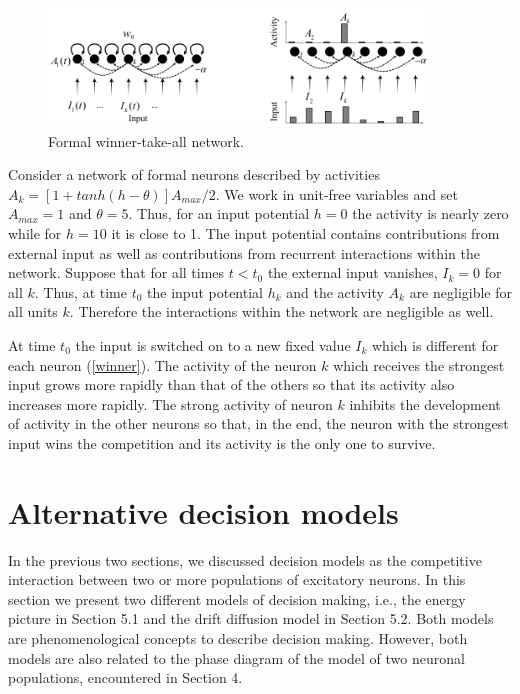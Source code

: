 \documentclass[12pt,hyperref,a4paper,UTF8]{ctexart}
\begin{document}
\begin{figure}[h]
    \begin{center}
    \includegraphics[width=0.9\textwidth]{winner.png}
    \caption{Formal winner-take-all network.}
    \label{winner}
    \end{center}
\end{figure}

Consider a network of formal neurons described by activities $A_k = [1 + tanh(h - \theta)] A_{max}/2$. We work in unit-free variables and set $A_{max} = 1$ and $\theta = 5$. Thus, for an input potential $h = 0$ the activity is nearly zero while for $h = 10$ it is close to 1. The input potential contains contributions from external input as well as contributions from recurrent interactions within the network. Suppose that for all times $t < t_0$ the external input vanishes, $I_k = 0$ for all $k$. Thus, at time $t_0$ the input potential $h_k$ and the activity $A_k$ are negligible for all units $k$. Therefore the interactions within the network are negligible as well.

At time $t_0$ the input is switched on to a new fixed value $I_k$ which is different for each neuron (\autoref{winner}). The activity of the neuron $k$ which receives the strongest input grows more rapidly than that of the others so that its activity also increases more rapidly. The strong activity of neuron $k$ inhibits the development of activity in the other neurons so that, in the end, the neuron with the strongest input wins the competition and its activity is the only one to survive.

\section{Alternative decision models}

In the previous two sections, we discussed decision models as the competitive interaction between two or more populations of excitatory neurons. In this section we present two different models of decision making, i.e., the energy picture in Section 5.1 and the drift diffusion model in Section 5.2. Both models are phenomenological concepts to describe decision making. However, both models are also related to the phase diagram of the model of two neuronal populations, encountered in Section 4.
\end{document}

